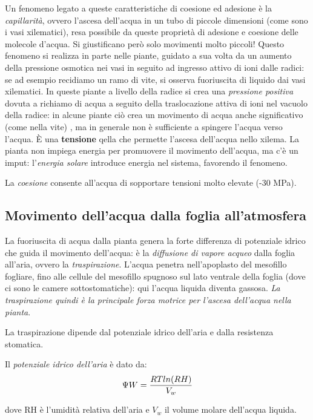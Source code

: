 \documentclass[a4paper,12pt]{book}
\begin{document}
Un fenomeno legato a queste caratteristiche di coesione ed adesione è la \emph{capillarità}, ovvero l'ascesa dell'acqua in un tubo di piccole dimensioni (come sono i vasi xilematici), resa possibile da queste proprietà di adesione e coesione delle molecole d'acqua. Si giustificano però solo movimenti molto piccoli! 
Questo fenomeno si realizza in parte nelle piante, guidato a sua volta da un aumento della pressione osmotica nei vasi in seguito ad ingresso attivo di ioni dalle radici: se ad esempio recidiamo un ramo di vite, si osserva fuoriuscita di liquido dai vasi xilematici. In queste piante a livello della radice si crea una \emph{pressione positiva} dovuta a richiamo di acqua a seguito della traslocazione attiva di ioni nel vacuolo della radice: in alcune piante ciò crea un movimento di acqua anche significativo (come nella vite) , ma in generale non è sufficiente a spingere l'acqua verso l'acqua. È una \textbf{tensione} qella che permette l'ascesa dell'acqua nello xilema.
La pianta non impiega energia per promuovere il movimento dell'acqua, ma c'è un imput: l'\emph{energia solare} introduce energia nel sistema, favorendo il fenomeno.

La \emph{coesione} consente all'acqua di sopportare tensioni molto elevate (-30 MPa).
\subsection{Movimento dell'acqua dalla foglia all'atmosfera}

La fuoriuscita di acqua dalla pianta genera la forte differenza di potenziale idrico che guida il movimento dell'acqua: è la \emph{diffusione di vapore acqueo} dalla foglia all'aria, ovvero la \emph{traspirazione}. L'acqua penetra nell'apoplasto del mesofillo fogliare, fino alle cellule del mesofillo spugnoso sul lato ventrale della foglia (dove ci sono le camere sottostomatiche): qui l'acqua liquida diventa gassosa. \emph{La traspirazione quindi è la principale forza motrice per l'ascesa dell'acqua nella pianta}.

La traspirazione dipende dal potenziale idrico dell'aria e dalla resistenza stomatica.

Il \emph{potenziale idrico dell'aria} è dato da:
\begin{equation}
\centering
\Psi W =\frac{RT ln(RH)}{V_{w}}
\end{equation}

dove RH è l'umidità relativa dell'aria e $V_{w}$ il volume molare dell'acqua liquida.
\end{document}
